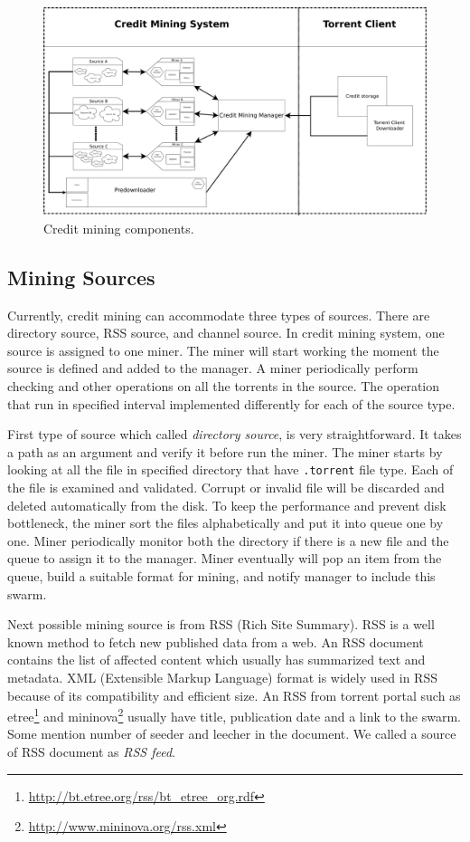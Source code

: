 \begin{figure}[ht]
	\centering
	\includegraphics[width=\textwidth]{pics/cm_components.pdf}
	\caption{Credit mining components.}
	\label{fig:cmcomponents}
\end{figure}

\subsection{Mining Sources}
Currently, credit mining can accommodate three types of sources. There are directory source, RSS source, and channel source. In credit mining system, one source is assigned to one miner. The miner will start working the moment the source is defined and added to the manager. A miner periodically perform checking and other operations on all the torrents in the source. The operation that run in specified interval implemented differently for each of the source type. 

First type of source which called \textit{directory source}, is very straightforward. It takes a path as an argument and verify it before run the miner. The miner starts by looking at all the file in specified directory that have \texttt{.torrent} file type. Each of the file is examined and validated. Corrupt or invalid file will be discarded and deleted automatically from the disk. To keep the performance and prevent disk bottleneck, the miner sort the files alphabetically and put it into queue one by one. Miner periodically monitor both the directory if there is a new file and the queue to assign it to the manager. Miner eventually will pop an item from the queue, build a suitable format for mining, and notify manager to include this swarm.

Next possible mining source is from RSS (Rich Site Summary). RSS is a well known method to fetch new published data from a web. An RSS document contains the list of affected content which usually has summarized text and metadata. XML (Extensible Markup Language) format is widely used in RSS because of its compatibility and efficient size. An RSS from torrent portal such as etree\footnote{\url{http://bt.etree.org/rss/bt_etree_org.rdf}} and mininova\footnote{\url{http://www.mininova.org/rss.xml}} usually have title, publication date and a link to the swarm. Some mention number of seeder and leecher in the document. We called a source of RSS document as \textit{RSS feed}. 

